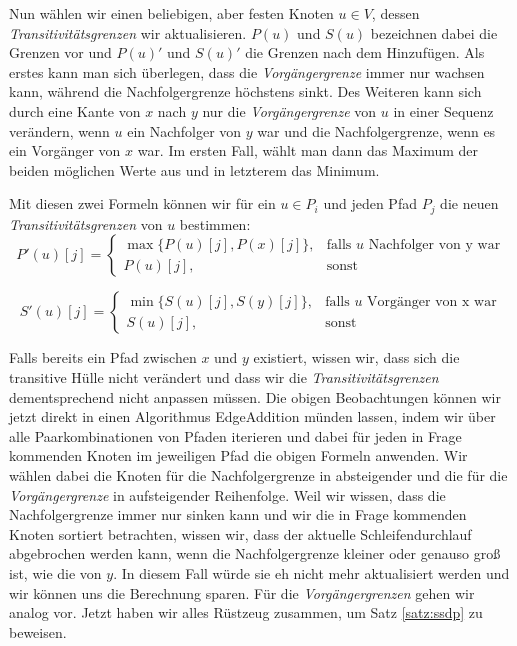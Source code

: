Nun wählen wir einen beliebigen, aber festen Knoten $u \in V$, dessen \emph{Transitivitätsgrenzen} wir aktualisieren. $P(u)$ und $S(u)$ bezeichnen dabei die Grenzen vor und $P(u)'$ und $S(u)'$ die Grenzen nach dem Hinzufügen. Als erstes kann man sich überlegen, dass die \emph{Vorgängergrenze} immer nur wachsen kann, während die Nachfolgergrenze höchstens sinkt. Des Weiteren kann sich durch eine Kante von $x$ nach $y$ nur die \emph{Vorgängergrenze} von $u$ in einer Sequenz verändern, wenn $u$ ein Nachfolger von $y$ war und die Nachfolgergrenze, wenn es ein Vorgänger von $x$ war. Im ersten Fall, wählt man dann das Maximum der beiden möglichen Werte aus und in letzterem das Minimum.  

Mit diesen zwei Formeln können wir für ein $u \in P_i$ und jeden Pfad $P_j$ die neuen \emph{Transitivitätsgrenzen} von $u$ bestimmen:
\begin{equation}
	P'(u)[j] = \begin{cases}
			\max\{P(u)[j], P(x)[j]\}, & \text{falls $u$ Nachfolger von y war} \\
			P(u)[j], & \text{sonst}
		\end{cases}
\end{equation} 

\begin{equation}
	S'(u)[j] = \begin{cases}
			\min\{S(u)[j], S(y)[j]\}, & \text{falls $u$ Vorgänger von x war} \\
			S(u)[j], & \text{sonst}
		\end{cases}
\end{equation}

Falls bereits ein Pfad zwischen $x$ und $y$ existiert, wissen wir, dass sich die transitive Hülle nicht verändert und dass wir die \emph{Transitivitätsgrenzen} dementsprechend nicht anpassen müssen. Die obigen Beobachtungen können wir jetzt direkt in einen Algorithmus \textrm{EdgeAddition} münden lassen, indem wir über alle Paarkombinationen von Pfaden iterieren und dabei für jeden in Frage kommenden Knoten im jeweiligen Pfad die obigen Formeln anwenden. Wir wählen dabei die Knoten für die Nachfolgergrenze in absteigender und die für die \emph{Vorgängergrenze} in aufsteigender Reihenfolge. Weil wir wissen, dass die Nachfolgergrenze immer nur sinken kann und wir die in Frage kommenden Knoten sortiert betrachten, wissen wir, dass der aktuelle Schleifendurchlauf abgebrochen werden kann, wenn die Nachfolgergrenze kleiner oder genauso groß ist, wie die von $y$. In diesem Fall würde sie eh nicht mehr aktualisiert werden und wir können uns die Berechnung sparen. Für die \emph{Vorgängergrenzen} gehen wir analog vor. Jetzt haben wir alles Rüstzeug zusammen, um Satz \ref{satz:ssdp} zu beweisen.

